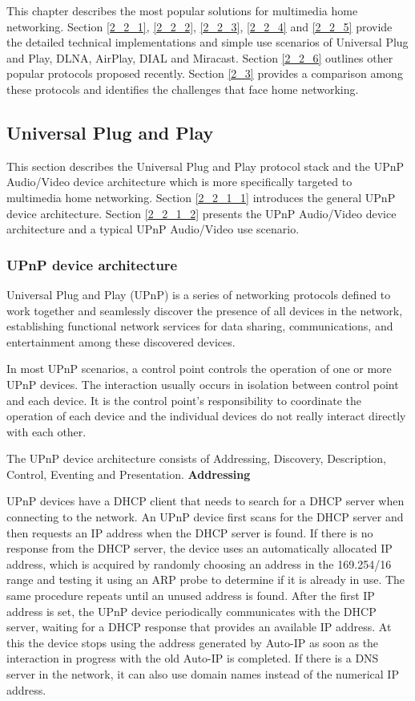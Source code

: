 
This chapter describes the most popular solutions for multimedia home
networking. Section \ref{2_2_1}, \ref{2_2_2}, \ref{2_2_3}, \ref{2_2_4} and
\ref{2_2_5} provide the detailed technical implementations and simple use
scenarios of Universal Plug and Play, DLNA, AirPlay, DIAL and Miracast. Section
\ref{2_2_6} outlines other popular protocols proposed recently. Section
\ref{2_3} provides a comparison among these protocols and identifies the
challenges that face home networking.
\subsection[Universal Plug and Play]{Universal Plug and Play\label{2_2_1}}
This section describes the Universal Plug and Play protocol stack and the UPnP
Audio/Video device architecture which is more specifically targeted to
multimedia home networking. Section \ref{2_2_1_1} introduces the general UPnP device architecture. Section \ref{2_2_1_2} presents the UPnP Audio/Video device architecture and a typical UPnP Audio/Video use scenario.
\subsubsection{UPnP device architecture\label{2_2_1_1}}
Universal Plug and Play (UPnP) is a series of networking protocols defined to 
work together and seamlessly discover the presence of all devices in the
network, establishing functional network services for data sharing,
communications, and entertainment among these discovered devices.

In most UPnP scenarios, a control point controls the operation of one or more 
UPnP devices. The interaction usually occurs in isolation between control point 
and each device. It is the control point's responsibility to coordinate the operation of 
each device and the individual devices do not really interact directly with each other.

The UPnP device architecture \cite{upnp} \label{upnp} \label{upnpdevice} 
consists of Addressing, Discovery, Description, Control, Eventing and
Presentation.
\clearpage
\textbf{Addressing}

UPnP devices have a DHCP client that needs to search for a DHCP server when
connecting to the network. An UPnP device first scans for the DHCP server and
then requests an IP address when the DHCP server is found. If there is no
response from the DHCP server, the device uses an automatically allocated IP
address, which is acquired by randomly choosing an address in the 169.254/16
range and testing it using an ARP probe to determine if it is already in use.
The same procedure repeats until an unused address is found. After the first IP
address is set, the UPnP device periodically communicates with the DHCP server,
waiting for a DHCP response that provides an available IP address. At this the
device stops using the address generated by Auto-IP as soon as the interaction
in progress with the old Auto-IP is completed. If there is a DNS server in the
network, it can also use domain names instead of the numerical IP address.

